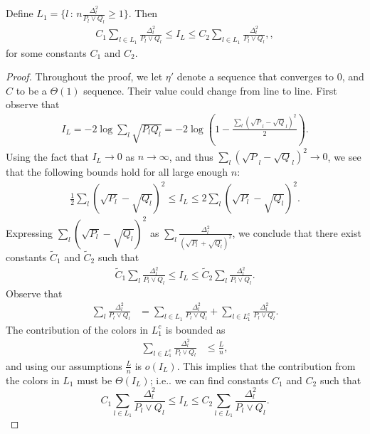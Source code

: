 \documentclass{article}
\begin{document}
\begin{lemma}\label{lem:friday_night}
Define $L_1 = \{ l \,:\, n \frac{\Delta_l^2}{P_l \vee Q_l} \geq 1 \}$. Then 
\begin{align}
 C_1\sum_{l \in L_1} \frac{\Delta_l^2}{P_l \vee Q_l} \leq I_L \leq  C_2 \sum_{l \in L_1} \frac{\Delta_l^2}{P_l \vee Q_l},  \label{eqn:good_color_I},
\end{align}
for some constants $C_1$ and $C_2$. 
\end{lemma}
\begin{proof}
Throughout the proof, we let $\eta'$ denote a sequence that converges to 0, and $C$ to be a $\Theta(1)$ sequence. Their value could change from line to line. First observe that
\begin{align*}
I_L  = -2 \log \sum_l \sqrt{P_l Q_l} = -2 \log \left( 1 - \frac{\sum_l (\sqrt P_l - \sqrt Q_l)^2}{2}\right).
\end{align*}
Using the fact that $I_L \to 0$ as $n \to \infty$, and thus $\sum_l (\sqrt P_l - \sqrt Q_l)^2 \to 0$, we see that the following bounds hold for all large enough $n$:
\begin{align*}
\frac{1}{2} \sum_l (\sqrt{P_l} - \sqrt{Q_l} )^2 \leq I_L \leq 2 \sum_l (\sqrt{P_l} - \sqrt{Q_l} )^2.
 \end{align*}
Expressing $\sum_l (\sqrt{P_l} - \sqrt{Q_l} )^2$ as $\sum_l \frac{\Delta_l^2}{(\sqrt{P_l} + \sqrt{Q_l})^2}$, we conclude that there exist constants $\tilde C_1$ and $ \tilde C_2$ such that
\begin{align*}
\tilde C_1\sum_{l } \frac{\Delta_l^2}{P_l \vee Q_l} \leq I_L \leq  \tilde C_2 \sum_{l } \frac{\Delta_l^2}{P_l \vee Q_l}.
\end{align*}
Observe that
\begin{align}
\sum_{l } \frac{\Delta_l^2}{P_l \vee Q_l} &= \sum_{l \in L_1} \frac{\Delta_l^2}{P_l \vee Q_l} + \sum_{l \in L_1^c} \frac{\Delta_l^2}{P_l \vee Q_l}.
\end{align}
The contribution of the colors in $L_1^c$ is bounded as
\begin{align}
\sum_{l \in L_1^c} \frac{\Delta_l^2}{P_l \vee Q_l} &\leq \frac{L}{n},
\end{align}
and using our assumptions $\frac{L}{n}$ is $o(I_L)$. This implies that the contribution from the colors in $L_1$ must be $\Theta(I_L)$; i.e.. we can find constants $C_1$ and $C_2$ such that
$$ C_1\sum_{l \in L_1} \frac{\Delta_l^2}{P_l \vee Q_l} \leq I_L \leq  C_2 \sum_{l \in L_1} \frac{\Delta_l^2}{P_l \vee Q_l}.$$
\end{proof}
\end{document}

